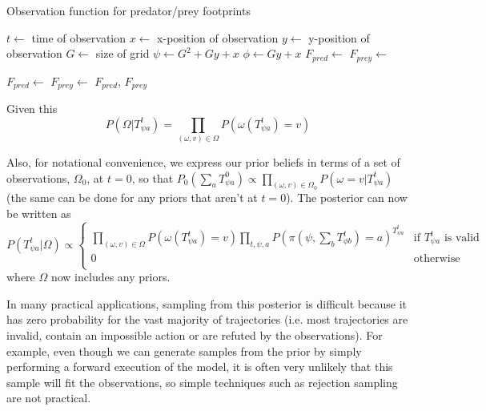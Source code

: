 \documentclass{article}
\begin{document}
\begin{algorithm}
\caption{Observation function for predator/prey footprints}
\label{observationFunc}
\begin{algorithmic}
 
\State $t \leftarrow$ time of observation
\State $x \leftarrow$ x-position of observation
\State $y \leftarrow$ y-position of observation
\State $G \leftarrow$ size of grid
\State $\psi \leftarrow G^2 + Gy + x$     
\State $\phi \leftarrow Gy + x$     
\State $F_{pred} \leftarrow$   
\State $F_{prey} \leftarrow$   

\State $F_{pred} \leftarrow$ 
\EndIf
{}
\State $F_{prey} \leftarrow$ 
\EndIf
\State\Return $F_{pred}$, $F_{prey}$
\EndFunction
\end{algorithmic}
\end{algorithm}


Given this
\[
P(\Omega|T^t_{\psi a}) = \prod_{(\omega,v) \in \Omega} P(\omega(T^t_{\psi a})=v)
\]

Also, for notational convenience, we express our prior beliefs in terms of a set of observations, $\Omega_0$, at $t=0$, so that $P_0(\sum_a T^0_{\psi a}) \propto \prod_{(\omega,v) \in \Omega_0} P(\omega=v|T^t_{\psi a})$ (the same can be done for any priors that aren't at $t=0$). The posterior can now be written as
\begin{equation}
P(T^t_{\psi a}|\Omega) \propto 
\begin{cases}
\prod_{(\omega,v) \in \Omega} P\left(\omega(T^{t}_{\psi a})=v\right) \prod_{t, \psi, a}P(\pi(\psi,\sum_bT^{t}_{\phi b})=a)^{T^{t}_{\psi a}} & \text{if } T^t_{\psi a} \text{ is valid} \\
0 & \text{otherwise}\\
\end{cases}
\label{posterior}
\end{equation}
where $\Omega$ now includes any priors.

In many practical applications, sampling from this posterior is difficult because it has zero probability for the vast majority of trajectories (i.e. most trajectories are invalid, contain an impossible action or are refuted by the observations). For example, even though we can generate samples from the prior by simply performing a forward execution of the model, it is often very unlikely that this sample will fit the observations, so simple techniques such as rejection sampling are not practical.
\end{document}
